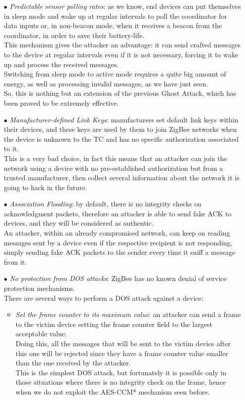 \documentclass[12pt]{report}
\begin{document}
{\begin{itemize}
\item[$\bullet$] \emph{Predictable sensor polling rates}: as we know, end devices can put themselves in sleep mode and wake up at regular intervals to poll the coordinator for data inputs or, in non-beacon mode, when it receives a beacon from the coordinator, in order to save their battery-life.\\
This mechanism gives the attacker an advantage: it can send crafted messages to the device at regular intervals even if it is not necessary, forcing it to wake up and process the received messages.\\
Switching from sleep mode to active mode requires a quite big amount of energy, as well as processing invalid messages, as we have just seen.\\
So, this is nothing but an extension of the previous Ghost Attack, which has been proved to be extremely effective.

\item[$\bullet$] \emph{Manufacturer-defined Link Keys}: manufacturers set default link keys within their devices, and these keys are used by them to join ZigBee networks when the device is unknown to the TC and has no specific authorization associated to it.\\
This is a very bad choice, in fact this means that an attacker can join the network using a device with no pre-established authorization but from a trusted manufacturer, then collect several information about the network it is going to hack in the future.

\item[$\bullet$] \emph{Association Flooding}: by default, there is no integrity checks on acknowledgment packets, therefore an attacker is able to send fake ACK to devices, and they will be considered as authentic.\\
An attacker, within an already compromised network, can keep on reading messages sent by a device even if the respective recipient is not responding, simply sending fake ACK packets to the sender every time it sniff a message from it. 

\item[$\bullet$] \emph{No protection from DOS attacks}: ZigBee has no known denial of service protection mechanisms.\\
There are several ways to perform a DOS attack against a device:


\begin{itemize}
\setlength{\itemindent}{+4mm}
\item \emph{Set the frame counter to its maximum value}: an attacker can send a frame to the victim device setting the frame counter field to the largest acceptable value.\\
Doing this, all the messages that will be sent to the victim device after this one will be rejected since they have a frame counter value smaller than the one received by the attacker.\\
This is the simplest DOS attack, but fortunately it is possible only in those situations where there is no integrity check on the frame, hence when we do not exploit the AES-CCM* mechanism seen before.\\


\end{itemize}
\end{itemize}}
\end{document}
